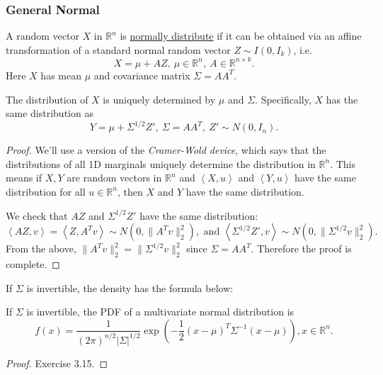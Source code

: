 \subsubsection{General Normal}
\begin{definition}[]
\label{def:3.3.5}
A random vector $X$ in $\mathbb{R}^n$ is \underline{normally distribute} if it can be obtained via an 
affine transformation of a standard normal random vector $Z \sim I(0, I_k)$, i.e.
\[ X = \mu + AZ, \ \mu \in \mathbb{R}^n, \ A \in \mathbb{R}^{n \times k}. \]
Here $X$ has mean $\mu$ and covariance matrix $\Sigma = AA^T$.
\end{definition}

\begin{proposition}
\label{prop:3.3.6}
The distribution of $X$ is uniquely determined by $\mu$ and $\Sigma$. Specifically, $X$ has the same 
distribution as 
\[ Y = \mu + \Sigma^{1/2}Z', \ \Sigma = AA^T, \ Z' \sim N(0, I_n). \]
\end{proposition}

\begin{proof}
We'll use a version of the \textit{Cramer-Wold device}, which says that the distributions of all 1D marginals 
uniquely determine the distribution in $\mathbb{R}^n$. This means if $X, Y$ are random vectors in $\mathbb{R}^n$ 
and $\left\langle X, u \right\rangle$ and $\left\langle Y, u \right\rangle$ have the same distribution for all 
$u \in \mathbb{R}^n$, then $X$ and $Y$ have the same distribution.

We check that $AZ$ and $\Sigma^{1/2} Z'$ have the same distribution: 
\[ \left\langle AZ, v \right\rangle = \left\langle Z, A^T v \right\rangle \sim N(0, 
\lVert A^T v \rVert_{2}^2), \text{ and } \left\langle \Sigma^{1/2}Z', v \right\rangle 
\sim N(0, \lVert \Sigma^{1/2} v \rVert_{2}^2). \]
From the above, $\lVert A^T v \rVert_{2}^2 = \lVert \Sigma^{1/2} v \rVert_{2}^2$ since $\Sigma = AA^T$. 
Therefore the proof is complete.
\end{proof}

If $\Sigma$ is invertible, the density has the formula below: 
\begin{proposition}[]
\label{prop:3.3.7}
If $\Sigma$ is invertible, the PDF of a multivariate normal distribution is 
\[ f(x) = \frac{1}{(2 \pi)^{n/2}|\Sigma|^{1/2}} \exp{\left( -\frac{1}{2}(x - \mu)^T \Sigma^{-1} 
(x - \mu)\right)}, x \in \mathbb{R}^n. \]
\end{proposition}

\begin{proof}
Exercise 3.15.
\end{proof}

